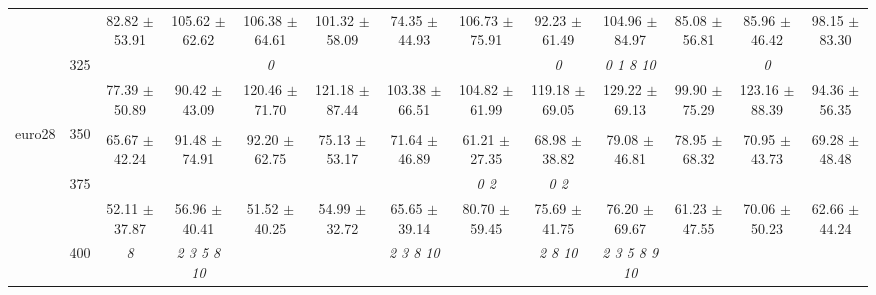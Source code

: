 \begin{table}[h]
{\begin{tabular}{
        ccccccccccccc}
 & & 82.82 $\pm$ 53.91& 105.62 $\pm$ 62.62& 106.38 $\pm$ 64.61& 101.32 $\pm$ 58.09& 74.35 $\pm$ 44.93& 106.73 $\pm$ 75.91& 92.23 $\pm$ 61.49& 104.96 $\pm$ 84.97& 85.08 $\pm$ 56.81& 85.96 $\pm$ 46.42& 98.15 $\pm$ 83.30 \\ 
 & \multirow{2}{*}{325}& \cellcolor[HTML]{EFEFEF} & \cellcolor[HTML]{EFEFEF} & \cellcolor[HTML]{EFEFEF} \textit{ 0 }& \cellcolor[HTML]{EFEFEF} & \cellcolor[HTML]{EFEFEF} & \cellcolor[HTML]{EFEFEF} & \cellcolor[HTML]{EFEFEF} \textit{ 0 }& \cellcolor[HTML]{EFEFEF} \textit{  0  1  8 10 }& \cellcolor[HTML]{EFEFEF} & \cellcolor[HTML]{EFEFEF} \textit{ 0 }& \cellcolor[HTML]{EFEFEF}  \\ 
 & & \cellcolor[HTML]{EFEFEF} 77.39 $\pm$ 50.89& \cellcolor[HTML]{EFEFEF} 90.42 $\pm$ 43.09& \cellcolor[HTML]{EFEFEF} 120.46 $\pm$ 71.70& \cellcolor[HTML]{EFEFEF} 121.18 $\pm$ 87.44& \cellcolor[HTML]{EFEFEF} 103.38 $\pm$ 66.51& \cellcolor[HTML]{EFEFEF} 104.82 $\pm$ 61.99& \cellcolor[HTML]{EFEFEF} 119.18 $\pm$ 69.05& \cellcolor[HTML]{EFEFEF} 129.22 $\pm$ 69.13& \cellcolor[HTML]{EFEFEF} 99.90 $\pm$ 75.29& \cellcolor[HTML]{EFEFEF} 123.16 $\pm$ 88.39& \cellcolor[HTML]{EFEFEF} 94.36 $\pm$ 56.35 \\ 
 \multirow{4}{*}{euro28} & \multirow{2}{*}{350}& & & & & & & & & & &  \\ 
 & & 65.67 $\pm$ 42.24& 91.48 $\pm$ 74.91& 92.20 $\pm$ 62.75& 75.13 $\pm$ 53.17& 71.64 $\pm$ 46.89& 61.21 $\pm$ 27.35& 68.98 $\pm$ 38.82& 79.08 $\pm$ 46.81& 78.95 $\pm$ 68.32& 70.95 $\pm$ 43.73& 69.28 $\pm$ 48.48 \\ 
 & \multirow{2}{*}{375}& \cellcolor[HTML]{EFEFEF} & \cellcolor[HTML]{EFEFEF} & \cellcolor[HTML]{EFEFEF} & \cellcolor[HTML]{EFEFEF} & \cellcolor[HTML]{EFEFEF} & \cellcolor[HTML]{EFEFEF} \textit{ 0 2 }& \cellcolor[HTML]{EFEFEF} \textit{ 0 2 }& \cellcolor[HTML]{EFEFEF} & \cellcolor[HTML]{EFEFEF} & \cellcolor[HTML]{EFEFEF} & \cellcolor[HTML]{EFEFEF}  \\ 
 & & \cellcolor[HTML]{EFEFEF} 52.11 $\pm$ 37.87& \cellcolor[HTML]{EFEFEF} 56.96 $\pm$ 40.41& \cellcolor[HTML]{EFEFEF} 51.52 $\pm$ 40.25& \cellcolor[HTML]{EFEFEF} 54.99 $\pm$ 32.72& \cellcolor[HTML]{EFEFEF} 65.65 $\pm$ 39.14& \cellcolor[HTML]{EFEFEF} 80.70 $\pm$ 59.45& \cellcolor[HTML]{EFEFEF} 75.69 $\pm$ 41.75& \cellcolor[HTML]{EFEFEF} 76.20 $\pm$ 69.67& \cellcolor[HTML]{EFEFEF} 61.23 $\pm$ 47.55& \cellcolor[HTML]{EFEFEF} 70.06 $\pm$ 50.23& \cellcolor[HTML]{EFEFEF} 62.66 $\pm$ 44.24 \\ 
 & \multirow{2}{*}{400}& \textit{ 8 }& \textit{  2  3  5  8 10 }& & & \textit{  2  3  8 10 }& & \textit{  2  8 10 }& \textit{  2  3  5  8  9 10 }& & &  \\ 

\end{tabular}}
\end{table}
